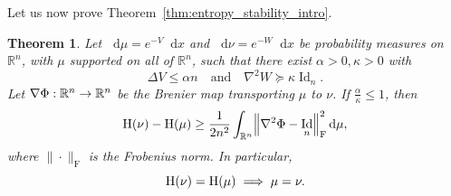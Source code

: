 \documentclass[10pt]{amsart}
\newtheorem{theo}{Theorem}[section]
\theoremstyle{definition}\newtheorem{defi}[theo]{Definition}\newtheorem{rema}[theo]{Remark}\newtheorem{exam}[theo]{Example}\newtheorem{exem}[theo]{Example}\newtheorem{nota}[theo]{Notation}
\newcommand{\R}{\mathbb R}
\DeclareMathOperator{\Id}{Id}
\newcommand{\Ent}{\mathrm H}
\newcommand{\V}{V}
\newcommand{\W}{W}
\newcommand{\dd}{n}
\newcommand{\source}{\mu}
\newcommand{\target}{\nu}
\newcommand{\lsh}{\alpha}
\newcommand{\lc}{\kappa}
\newcommand*\diff{\mathop{}\!\mathrm{d}}
\newcommand{\OT}{\Phi}
\renewcommand*{\to}{\mathchoice{\longrightarrow}{\rightarrow}{\rightarrow}{\rightarrow}}
\renewcommand*{\implies}{\mathchoice{\Longrightarrow}{\Rightarrow}{\Rightarrow}{\Rightarrow}}
\let\originalleft\left
\let\originalright\right
\renewcommand{\left}{\mathopen{}\mathclose\bgroup\originalleft}
\renewcommand{\right}{\aftergroup\egroup\originalright}
\begin{document}
Let us now prove Theorem~\ref{thm:entropy_stability_intro}.
\begin{theo}\label{thm:stab}
Let $\diff\source=e^{-\V}\diff x$ and $\diff\target=e^{-\W}\diff x$ be probability measures on~$\R^{\dd}$, with $\source$ supported on all of $\R^{\dd}$, such that there exist $\lsh>0,\lc>0$ with
\[
\Delta \V \le \lsh\dd \quad\text{and}\quad \nabla^2\W \succeq \lc \Id_{\dd}.
\]
Let $\nabla\OT:\R^{\dd}\to\R^{\dd}$ be the Brenier map transporting $\source$ to $\target$. If $\frac{\lsh}{\lc}\le 1$, then
\begin{equation}\label{eq:stab_proof}
\Ent(\target)- \Ent(\source) \ge \frac{1}{2\dd^2}\int_{\R^{\dd}}\left\|\nabla^2\OT-\Id_{\dd}\right\|_{\text{F}}^2\diff \source,
\end{equation}
where $\|\cdot\|_{\text{F}}$ is the Frobenius norm. In particular,
\begin{equation}\label{eq:entropy_eq_proof}
\Ent(\target)= \Ent(\source)\;\implies \; \source=\target.
\end{equation}
\end{theo}
\end{document}

